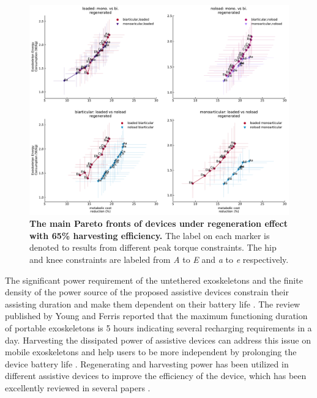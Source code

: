 \documentclass[10pt,letterpaper]{article}
\begin{document}
\begin{figure}[t!]   
	\centering
	\includegraphics[width=\linewidth]{Pareto_Mass_Regenration_Figures/PaperFigure_Main_Pareto_Regenerated.pdf}
	\vspace{1mm}
	\caption{{\small\textbf{The main Pareto fronts of devices under regeneration effect with 65\% harvesting efficiency.} The label on each marker is denoted to results from different peak torque constraints. The hip and knee constraints are labeled from {\it A} to {\it E} and {\it a} to {\it e} respectively.}}
	\label{Fig_Regenerated_Main_Paretofronts}
\end{figure}
The significant power requirement of the untethered exoskeletons and the finite density of the power source of the proposed assistive devices constrain their assisting duration and make them dependent on their battery life \cite{140}. The review published by Young and Ferris \cite {36} reported that the maximum functioning duration of portable exoskeletons is 5 hours indicating several recharging requirements in a day. Harvesting the dissipated power of assistive devices can address this issue on mobile exoskeletons and help users to be more independent by prolonging the device battery life \cite{140,141,142}. Regenerating and harvesting power has been utilized in different assistive devices to improve the efficiency of the device, which has been excellently reviewed in several papers \cite{140,141,142}.\\
\end{document}

